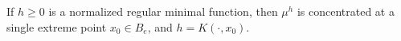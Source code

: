If $h \geq 0$ is a normalized regular minimal function, then $\mu^h$ is concentrated at a single extreme point $x_0 \in B_e$, and $h = K(\cdot, x_0)$.
